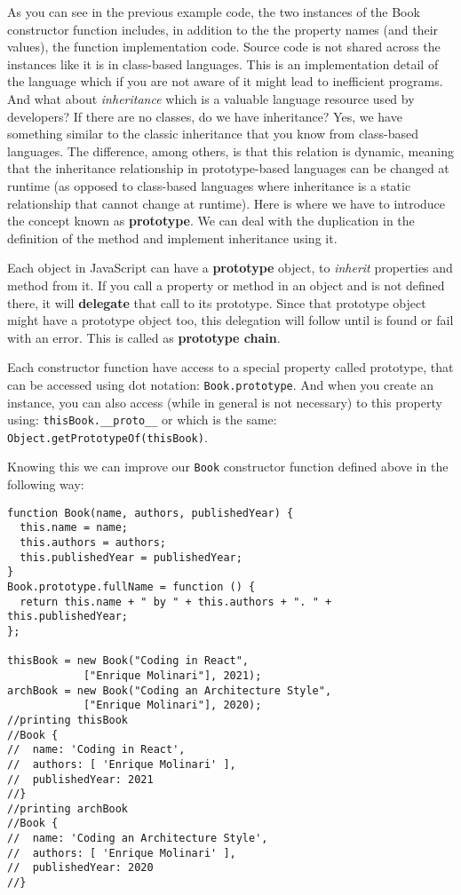 \documentclass[a4paper, oneside, titlepage, 12pt]{book}
\begin{document}
As you can see in the previous example code, the two instances of the Book constructor function includes, in addition to the the property names (and their values), the function implementation code. Source code is not shared across the instances like it is in class-based languages. This is an implementation detail of the language which if you are not aware of it might lead to inefficient programs. And what about \textit{inheritance} which is a valuable language resource used by developers? If there are no classes, do we have inheritance? Yes, we have something similar to the classic inheritance that you know from class-based languages. The difference, among others, is that this relation is dynamic, meaning that the inheritance relationship in prototype-based languages can be changed at runtime (as opposed to class-based languages where inheritance is a static relationship that cannot change at runtime). Here is where we have to introduce the concept known as \textbf{prototype}. We can deal with the duplication in the definition of the method and implement inheritance using it. 
\newline

Each object in JavaScript can have a \textbf{prototype} object, to \textit{inherit} properties and method from it. If you call a property or method in an object and is not defined there, it will \textbf{delegate} that call to its prototype. Since that prototype object might have a prototype object too, this delegation will follow until is found or fail with an error. This is called as \textbf{prototype chain}. 
\newline

Each constructor function have access to a special property called prototype, that can be accessed using dot notation: \texttt{Book.prototype}. And when you create an instance, you can also access (while in general is not necessary) to this property using: \texttt{thisBook.__proto__} or which is the same:\\ \texttt{Object.getPrototypeOf(thisBook)}.

Knowing this we can improve our \texttt{Book} constructor function defined above in the following way:

\begin{verbatim}
function Book(name, authors, publishedYear) {
  this.name = name;
  this.authors = authors;
  this.publishedYear = publishedYear;
}
Book.prototype.fullName = function () {
  return this.name + " by " + this.authors + ". " + this.publishedYear;
};               
               
thisBook = new Book("Coding in React", 
			["Enrique Molinari"], 2021);
archBook = new Book("Coding an Architecture Style", 
			["Enrique Molinari"], 2020);
//printing thisBook
//Book {
//  name: 'Coding in React',
//  authors: [ 'Enrique Molinari' ],
//  publishedYear: 2021
//}
//printing archBook
//Book {
//  name: 'Coding an Architecture Style',
//  authors: [ 'Enrique Molinari' ],
//  publishedYear: 2020
//}
\end{verbatim}
\end{document}
